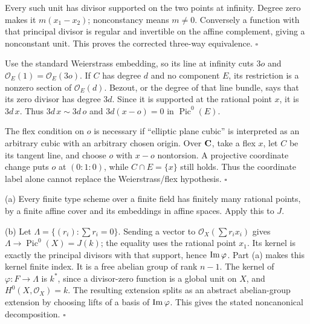 \documentclass[11pt]{article}
\let\chapterexercise\exercise
\renewcommand{\exercise}[2]{\Needspace{8\baselineskip}\chapterexercise{#1}{#2}}
\begin{document}
Every such unit has divisor supported on the two points at infinity. Degree zero makes it $m(x_1-x_2)$; nonconstancy means $m\ne0$. Conversely a function with that principal divisor is regular and invertible on the affine complement, giving a nonconstant unit. This proves the corrected three-way equivalence. \hfill$\square$

\pf
Use the standard Weierstrass embedding, so its line at infinity cuts $3o$ and $\mathcal O_E(1)=\mathcal O_E(3o)$. If $C$ has degree $d$ and no component $E$, its restriction is a nonzero section of $\mathcal O_E(d)$. Bezout, or the degree of that line bundle, says that its zero divisor has degree $3d$. Since it is supported at the rational point $x$, it is $3d\,x$. Thus $3d\,x\sim3d\,o$ and $3d(x-o)=0$ in $\operatorname{Pic}^0(E)$.

The flex condition on $o$ is necessary if ``elliptic plane cubic'' is interpreted as an arbitrary cubic with an arbitrary chosen origin. Over $\mathbf C$, take a flex $x$, let $C$ be its tangent line, and choose $o$ with $x-o$ nontorsion. A projective coordinate change puts $o$ at $(0:1:0)$, while $C\cap E=\{x\}$ still holds. Thus the coordinate label alone cannot replace the Weierstrass/flex hypothesis. \hfill$\square$

\pf
(a) Every finite type scheme over a finite field has finitely many rational points, by a finite affine cover and its embeddings in affine spaces. Apply this to $J$.

(b) Let $\Lambda=\{(r_i):\sum r_i=0\}$. Sending a vector to $\mathcal O_X(\sum r_ix_i)$ gives $\Lambda\to\operatorname{Pic}^0(X)=J(k)$; the equality uses the rational point $x_1$. Its kernel is exactly the principal divisors with that support, hence $\operatorname{Im}\varphi$. Part (a) makes this kernel finite index. It is a free abelian group of rank $n-1$. The kernel of $\varphi:F\to\Lambda$ is $k^*$, since a divisor-zero function is a global unit on $X$, and $H^0(X,\mathcal O_X)=k$. The resulting extension splits as an abstract abelian-group extension by choosing lifts of a basis of $\operatorname{Im}\varphi$. This gives the stated noncanonical decomposition. \hfill$\square$
\end{document}
